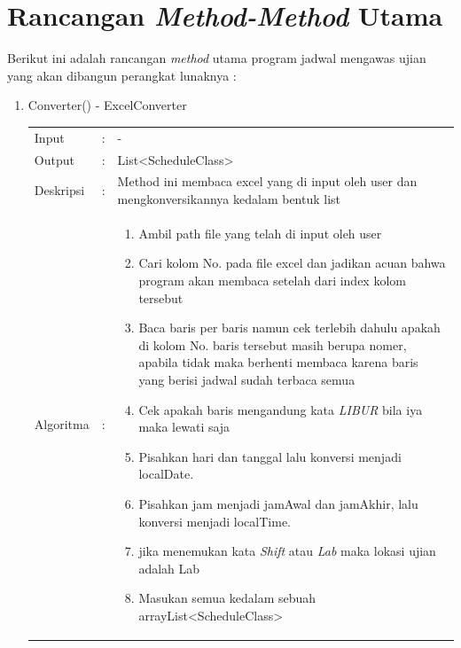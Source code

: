 \section{Rancangan \textit{Method-Method} Utama}
Berikut ini adalah rancangan \textit{method} utama program jadwal mengawas ujian yang akan dibangun perangkat lunaknya :
\begin{enumerate}
	\item Converter() - ExcelConverter\\
	\begin{tabular}{l c p{9cm}}
		Input & : & - \\ 
		Output & : & List<ScheduleClass>  \\ 
		Deskripsi & : & Method ini membaca excel yang di input oleh user dan mengkonversikannya kedalam bentuk list\\
		Algoritma & : & \begin{enumerate}
			\item Ambil path file yang telah di input oleh user
			\item Cari kolom No. pada file excel dan jadikan acuan bahwa program akan membaca setelah dari index kolom tersebut
			\item Baca baris per baris namun cek terlebih dahulu apakah di kolom No. baris tersebut masih berupa nomer, apabila tidak maka berhenti membaca karena baris yang berisi jadwal sudah terbaca semua
			\item Cek apakah baris mengandung kata \textit{LIBUR} bila iya maka lewati saja
			\item Pisahkan hari dan tanggal lalu konversi menjadi localDate. 
			\item Pisahkan jam menjadi jamAwal dan jamAkhir, lalu konversi menjadi localTime.
			\item jika menemukan kata \textit{Shift} atau \textit{Lab} maka lokasi ujian adalah Lab
			\item Masukan semua kedalam sebuah arrayList<ScheduleClass>
		\end{enumerate}
		\end{tabular}	
	

\end{enumerate}
